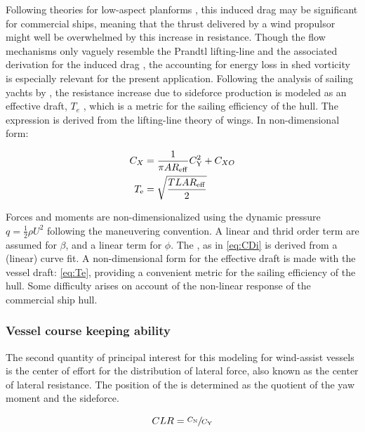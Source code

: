 \documentclass[twoside,twocolumn]{article}
\begin{document}
	Following theories for low-aspect planforms \cite{Hoerner1985,Jones1946}, this induced drag may be significant for commercial ships, meaning that the thrust delivered by a wind propulsor might well be overwhelmed by this increase in resistance. Though the flow mechanisms only vaguely resemble the Prandtl lifting-line and the associated derivation for the induced drag \cite{Prandtl1918}, the accounting for energy loss in shed vorticity is especially relevant for the present application. Following the analysis of sailing yachts by \citet{Gerritsma1992}, the resistance increase due to sideforce production is modeled as an effective draft, $T_{e}$ \cite{Gerritsma1993}, which is a metric for the sailing efficiency of the hull. The expression is derived from the lifting-line theory of wings. In non-dimensional form:
	
	\begin{subequations}
		\begin{align}
		C_{X}&=\frac{1}{\pi AR_\mathrm{eff}}C_\mathrm{Y}^2+C_{XO} 
		\label{eq:CDi}\\
		T_\mathrm{e}&=\sqrt{\dfrac{TLAR_\mathrm{eff}}{2}} 
		\label{eq:Te}
		\end{align}
	\end{subequations}
	
	\noindent
	Forces and moments are non-dimensionalized using the dynamic pressure $q=\frac{1}{2}\rho U^2 $ following the maneuvering convention. A linear and thrid order term are assumed for $\beta$, and a linear term for $\phi$. The \ARe, as in \cref{eq:CDi} is derived from a (linear) curve fit. A non-dimensional form for the effective draft \Te is made with the vessel draft: \TeT \cref{eq:Te}, providing a convenient metric for the sailing efficiency of the hull. Some difficulty arises on account of the non-linear response of the commercial ship hull.
	
	\subsubsection{Vessel course keeping ability}
	The second quantity of principal interest for this modeling for wind-assist vessels is the center of effort for the distribution of lateral force, also known as the center of lateral resistance. The position of the \CLR is determined as the quotient of the yaw moment and the sideforce.
	
	\begin{equation}
	CLR=\sfrac{C_\mathrm{N}}{C_\mathrm{Y}}
	\end{equation}
	
\end{document}
